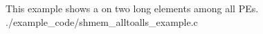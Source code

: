 \begin{apidefinition}
\begin{apiexamples}

\apicexample
    {This example shows a  on two long elements among
    all \acp{PE}.}
    {./example_code/shmem_alltoalls_example.c}
    {}

\end{apiexamples}

\end{apidefinition}
